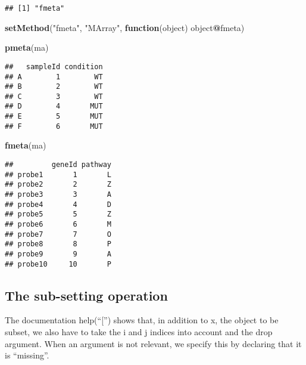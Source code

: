 \documentclass[]{article}
\newenvironment{Shaded}{\begin{snugshade}}{\end{snugshade}}
\newcommand{\ControlFlowTok}[1]{\textcolor[rgb]{0.13,0.29,0.53}{\textbf{#1}}}
\newcommand{\KeywordTok}[1]{\textcolor[rgb]{0.13,0.29,0.53}{\textbf{#1}}}
\newcommand{\NormalTok}[1]{#1}
\newcommand{\OperatorTok}[1]{\textcolor[rgb]{0.81,0.36,0.00}{\textbf{#1}}}
\newcommand{\StringTok}[1]{\textcolor[rgb]{0.31,0.60,0.02}{#1}}
\begin{document}
\begin{verbatim}
## [1] "fmeta"
\end{verbatim}

\begin{Shaded}
\begin{Highlighting}[]
\KeywordTok{setMethod}\NormalTok{(}\StringTok{"fmeta"}\NormalTok{, }\StringTok{"MArray"}\NormalTok{, }\ControlFlowTok{function}\NormalTok{(object) object}\OperatorTok{@}\NormalTok{fmeta)}
\end{Highlighting}
\end{Shaded}

\begin{Shaded}
\begin{Highlighting}[]
\KeywordTok{pmeta}\NormalTok{(ma)}
\end{Highlighting}
\end{Shaded}

\begin{verbatim}
##   sampleId condition
## A        1        WT
## B        2        WT
## C        3        WT
## D        4       MUT
## E        5       MUT
## F        6       MUT
\end{verbatim}

\begin{Shaded}
\begin{Highlighting}[]
\KeywordTok{fmeta}\NormalTok{(ma)}
\end{Highlighting}
\end{Shaded}

\begin{verbatim}
##         geneId pathway
## probe1       1       L
## probe2       2       Z
## probe3       3       A
## probe4       4       D
## probe5       5       Z
## probe6       6       M
## probe7       7       O
## probe8       8       P
## probe9       9       A
## probe10     10       P
\end{verbatim}

\hypertarget{the-sub-setting-operation}{%
\subsection{The sub-setting operation}\label{the-sub-setting-operation}}

The documentation help(``{[}'') shows that, in addition to x, the object
to be subset, we also have to take the i and j indices into account and
the drop argument. When an argument is not relevant, we specify this by
declaring that it is ``missing''.
\end{document}
